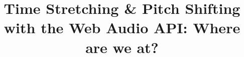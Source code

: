 \documentclass{sig-alternate}
\begin{document}


%
%
%

%

\title{Time Stretching \& Pitch Shifting with the Web Audio API: Where are we at?}
%
%
%
%
%
\end{document}
